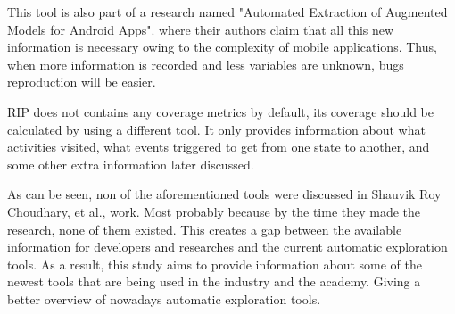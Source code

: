 This tool is also part of a research named "Automated Extraction of Augmented Models for Android Apps". where their authors claim that all this new information is necessary owing to the complexity of mobile applications. Thus, when more information is recorded and less variables are unknown, bugs reproduction will be easier.

RIP does not contains any coverage metrics by default, its coverage should be calculated by using a different tool. It only provides information about what activities visited, what events triggered to get from one state to another, and some other extra information later discussed.

As can be seen, non of the aforementioned tools were discussed in Shauvik Roy Choudhary, et al., \MARIO{[CITE]} work. Most probably because by the time they made the research, none of them existed. This creates a gap between the available information for developers and researches and the current automatic exploration tools. As a result, this study aims to provide information about some of the newest tools that are being used in the industry and the academy. Giving a better overview of nowadays automatic exploration tools.